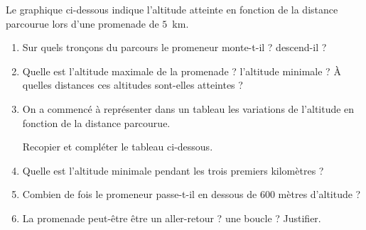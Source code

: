 \documentclass[12pt,french]{book}
\begin{document}

Le graphique ci-dessous indique l'altitude atteinte en fonction de la distance parcourue lors d'une promenade de $5$~km.

\begin{center}
\end{center}

\begin{enumerate}
    \item Sur quels tronçons du parcours le promeneur monte-t-il ? descend-il ?
    \item Quelle est l'altitude maximale de la promenade ? l'altitude minimale ? À quelles distances ces altitudes sont-elles atteintes ?
    \item On a commencé à représenter dans un tableau les variations de l'altitude en fonction de la distance parcourue.\par Recopier et compléter le tableau ci-dessous.
        \begin{center}
        \end{center}
    \item Quelle est l'altitude minimale pendant les trois premiers kilomètres ?
    \item Combien de fois le promeneur passe-t-il en dessous de $600$ mètres d'altitude ?
    \item La promenade peut-être être un aller-retour ? une boucle ? Justifier.
\end{enumerate}
\end{document}
